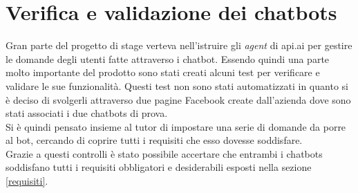 \section{Verifica e validazione dei chatbots}
Gran parte del progetto di stage verteva nell'istruire gli \emph{agent} di api.ai per gestire le domande degli utenti fatte attraverso i \gls{chatbot}. Essendo quindi una parte molto importante del prodotto sono stati creati alcuni test per verificare e validare le sue funzionalità. Questi test non sono stati automatizzati in quanto si è deciso di svolgerli attraverso due pagine Facebook create dall'azienda dove sono stati associati i due \glspl{chatbot} di prova.\\
Si è quindi pensato insieme al tutor di impostare una serie di domande da porre al bot, cercando di coprire tutti i requisiti che esso dovesse soddisfare. \\
Grazie a questi controlli è stato possibile accertare che entrambi i \glspl{chatbot} soddisfano tutti i requisiti obbligatori e desiderabili esposti nella sezione \ref{requisiti}.

